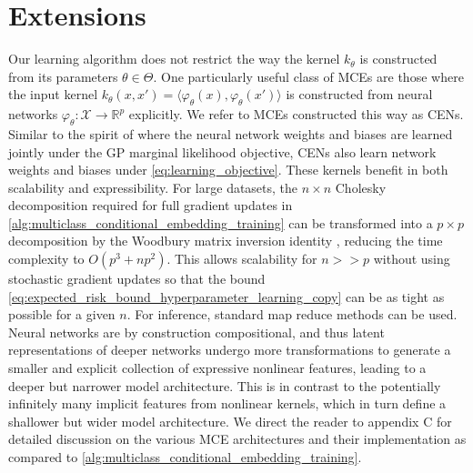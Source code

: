 \documentclass[twoside]{article}
\begin{document}
	\section{Extensions}
	
		Our learning algorithm does not restrict the way the kernel $k_{\theta}$ is constructed from its parameters $\theta \in \Theta$. One particularly useful class of \glspl{MCE} are those where the input kernel $k_{\theta}(x, x') = \langle \varphi_{\theta}(x), \varphi_{\theta}(x') \rangle$ is constructed from neural networks $\varphi_{\theta} : \mathcal{X} \to \mathbb{R}^{p}$ explicitly. We refer to \glspl{MCE} constructed this way as \glspl{CEN}. Similar to the spirit of \cite{wilson2016stochastic} where the neural network weights and biases are learned jointly under the \gls{GP} marginal likelihood objective, \glspl{CEN} also learn network weights and biases under \eqref{eq:learning_objective}. These kernels benefit in both scalability and expressibility. For large datasets, the $n \times n$ Cholesky decomposition required for full gradient updates in \cref{alg:multiclass_conditional_embedding_training} can be transformed into a $p \times p$ decomposition by the Woodbury matrix inversion identity \citep{higham2002accuracy}, reducing the time complexity to $O(p^{3} + np^{2})$. This allows scalability for $n >> p$ without using stochastic gradient updates so that the bound \eqref{eq:expected_risk_bound_hyperparameter_learning_copy} can be as tight as possible for a given $n$. For inference, standard map reduce methods can be used. Neural networks are by construction compositional, and thus latent representations of deeper networks undergo more transformations to generate a smaller and explicit collection of expressive nonlinear features, leading to a deeper but narrower model architecture. This is in contrast to the potentially infinitely many implicit features from nonlinear kernels, which in turn define a shallower but wider model architecture. We direct the reader to appendix C for detailed discussion on the various \gls{MCE} architectures and their implementation as compared to \cref{alg:multiclass_conditional_embedding_training}. 
		
\end{document}
